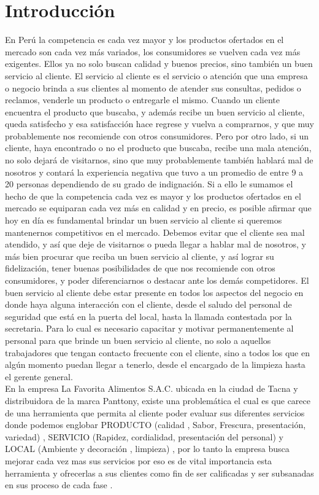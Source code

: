 \documentclass[preprint,12pt]{elsarticle}
\begin{document}
\section{Introducción}
En Perú la competencia es cada vez mayor y los productos ofertados en el mercado son cada vez más variados, los consumidores se vuelven cada vez más exigentes. Ellos ya no solo buscan calidad y buenos precios, sino también un buen servicio al cliente.
El servicio al cliente es el servicio o atención que una empresa o negocio brinda a sus clientes al momento de atender sus consultas, pedidos o reclamos, venderle un producto o entregarle el mismo.
Cuando un cliente encuentra el producto que buscaba, y además recibe un buen servicio al cliente, queda satisfecho y esa satisfacción hace regrese y vuelva a comprarnos, y que muy probablemente nos recomiende con otros consumidores.
Pero por otro lado, si un cliente, haya encontrado o no el producto que buscaba, recibe una mala atención, no solo dejará de visitarnos, sino que muy probablemente también hablará mal de nosotros y contará la experiencia negativa que tuvo a un promedio de entre 9 a 20 personas dependiendo de su grado de indignación.
Si a ello le sumamos el hecho de que la competencia cada vez es mayor y los productos ofertados en el mercado se equiparan cada vez más en calidad y en precio, es posible afirmar que hoy en día es fundamental brindar un buen servicio al cliente si queremos mantenernos competitivos en el mercado.
Debemos evitar que el cliente sea mal atendido, y así que deje de visitarnos o pueda llegar a hablar mal de nosotros, y más bien procurar que reciba un buen servicio al cliente, y así lograr su fidelización, tener buenas posibilidades de que nos recomiende con otros consumidores, y poder diferenciarnos o destacar ante los demás competidores.
El buen servicio al cliente debe estar presente en todos los aspectos del negocio en donde haya alguna interacción con el cliente, desde el saludo del personal de seguridad que está en la puerta del local, hasta la llamada contestada por la secretaria. Para lo cual es necesario capacitar y motivar permanentemente al personal para que brinde un buen servicio al cliente, no solo a aquellos trabajadores que tengan contacto frecuente con el cliente, sino a todos los que en algún momento puedan llegar a tenerlo, desde el encargado de la limpieza hasta el gerente general.
\\En la empresa La Favorita Alimentos S.A.C. ubicada en la ciudad de Tacna y distribuidora de la marca Panttony, existe una problemática el cual es que carece de una herramienta que permita al cliente poder evaluar sus diferentes servicios donde podemos englobar PRODUCTO (calidad , Sabor, Frescura, presentación, variedad) , SERVICIO (Rapidez, cordialidad, presentación del personal) y LOCAL (Ambiente y decoración , limpieza) , por lo tanto la empresa busca mejorar cada vez mas sus servicios por eso es de vital importancia esta herramienta y ofrecerlas a sus clientes como fin de ser calificadas y ser subsanadas en sus proceso de cada fase .
\end{document}
